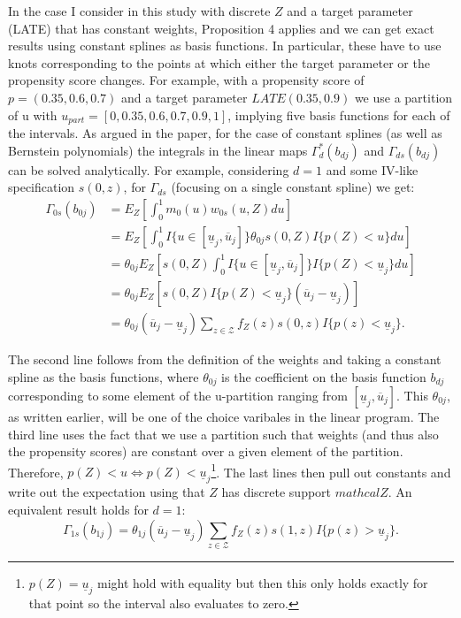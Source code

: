 \documentclass{article}
\begin{document}
In the case I consider in this study with discrete $Z$ and a target parameter (LATE) that has constant weights, Proposition 4 applies and we can get exact results using constant splines as basis functions.
In particular, these have to use knots corresponding to the points at which either the target parameter or the propensity score changes.
For example, with a propensity score of $p=(0.35, 0.6, 0.7)$ and a target parameter $LATE(0.35, 0.9)$ we use a partition of u with $u_{part} = [0, 0.35, 0.6, 0.7, 0.9, 1]$, implying five basis functions for each of the intervals.
As argued in the paper, for the case of constant splines (as well as Bernstein polynomials) the integrals in the linear maps $\Gamma^*_d(b_{dj})$ and $\Gamma_{ds}(b_{dj})$ can be solved analytically. For example, considering $d=1$ and some IV-like specification $s(0,z)$, for $\Gamma_{ds}$ (focusing on a single constant spline) we get:
\begin{equation} 
    \begin{split}
    \Gamma_{0s}(b_{0j}) & = E_Z\left[\int_0^1 m_0(u)w_{0s}(u,Z)du\right] \\
     & = E_Z\left[\int_0^1 I\{u\in[\underline{u}_j, \overline{u}_j]\}\theta_{0j} s(0, Z) I\{p(Z)<u\}du\right] \\
     & = \theta_{0j}E_Z\left[s(0,Z)\int_0^1 I\{u\in[\underline{u}_j, \overline{u}_j]\}I\{p(Z)<\underline{u}_j\}du\right] \\
     & = \theta_{0j}E_Z\left[s(0,Z)I\{p(Z)<\underline{u}_j\}(\overline{u}_j-\underline{u}_j)\right] \\
     & = \theta_{0j}(\overline{u}_j-\underline{u}_j)\sum_{z\in \mathcal{Z}}f_Z(z) s(0,z) I\{p(z)< \underline{u}_j\}.
    \end{split}
\end{equation}

The second line follows from the definition of the weights and taking a constant spline as the basis functions, where $\theta_{0j}$ is the coefficient on the basis function $b_{dj}$ corresponding to some element of the u-partition ranging from $[\underline{u}_j,\overline{u}_j]$.
This $\theta_{0j}$, as written earlier, will be one of the choice varibales in the linear program. The third line uses the fact that we use a partition such that weights (and thus also the propensity scores) are constant over a given element of the partition.
Therefore, $p(Z)<u \iff p(Z)<\underline{u}_j$\footnote{$p(Z) = \underline{u}_j$ might hold with equality but then this only holds exactly for that point so the interval also evaluates to zero.}.
The last lines then pull out constants and write out the expectation using that $Z$ has discrete support $mathcal{Z}$.
An equivalent result holds for $d=1$:
\begin{equation}
    \Gamma_{1s}(b_{1j}) = \theta_{1j}(\overline{u}_j-\underline{u}_j)\sum_{z\in \mathcal{Z}}f_Z(z) s(1,z) I\{p(z)> \underline{u}_j\}.
\end{equation}
\end{document}
